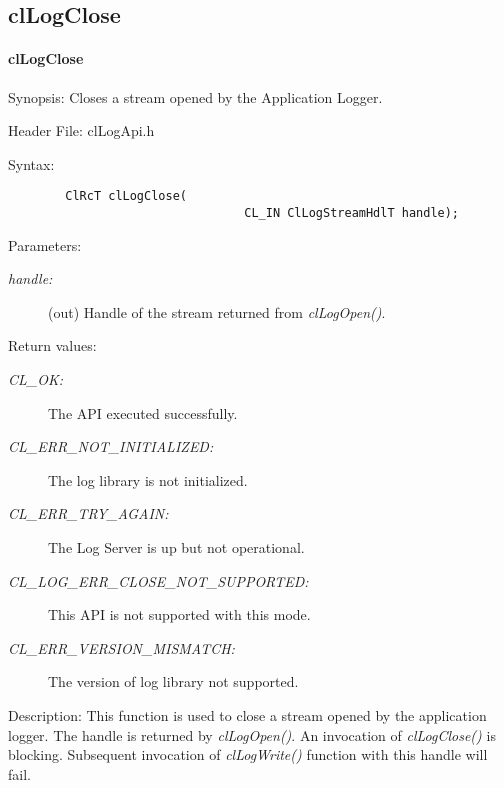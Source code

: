 \subsection{clLogClose}
\hypertarget{pagelog106}{}\paragraph{cl\-Log\-Close}\label{pagelog106}
\begin{Desc}
\item[Synopsis:]Closes a stream opened by the Application Logger.\end{Desc}
\begin{Desc}
\item[Header File:]clLogApi.h\end{Desc}
\begin{Desc}
\item[Syntax:]

\footnotesize\begin{verbatim}        ClRcT clLogClose(
                                 CL_IN ClLogStreamHdlT handle);
\end{verbatim}
\normalsize
\end{Desc}
\begin{Desc}
\item[Parameters:]
\begin{description}
\item[{\em handle:}](out) Handle of the stream returned from \textit{clLogOpen()}.\end{description}
\end{Desc}
\begin{Desc}
\item[Return values:]
\begin{description}
\item[{\em CL\_\-OK:}]The API executed successfully. \item[{\em CL\_\-ERR\_\-NOT\_\-INITIALIZED:}]The log library is not initialized. \item[{\em CL\_\-ERR\_\-TRY\_\-AGAIN:}]The Log Server is up but not operational. \item[{\em CL\_\-LOG\_\-ERR\_\-CLOSE\_\-NOT\_\-SUPPORTED:}]This API is not supported with this mode. \item[{\em CL\_\-ERR\_\-VERSION\_\-MISMATCH:}]The version of log library not supported.\end{description}
\end{Desc}
\begin{Desc}
\item[Description:]This function is used to close a stream opened by the application logger. The handle is returned by \textit{clLogOpen()}. An 
invocation of \textit{clLogClose()} is blocking. Subsequent invocation of \textit{clLogWrite()} function with this
handle will fail.\end{Desc}
